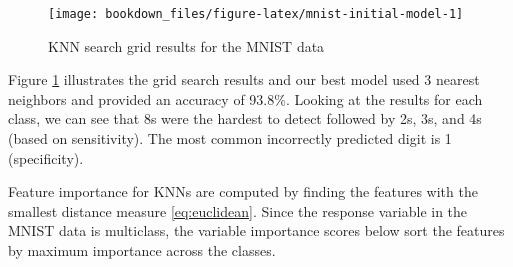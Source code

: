 \documentclass[]{krantz}
\makeatletter
\newenvironment{Shaded}{\begin{snugshade}}{\end{snugshade}}
\newcommand{\CommentTok}[1]{\textcolor[rgb]{0.37,0.37,0.37}{\textit{#1}}}
\newcommand{\DecValTok}[1]{\textcolor[rgb]{0.06,0.06,0.06}{#1}}
\newcommand{\KeywordTok}[1]{\textcolor[rgb]{0.27,0.27,0.27}{\textbf{#1}}}
\newcommand{\NormalTok}[1]{#1}
\newcommand{\OperatorTok}[1]{\textcolor[rgb]{0.43,0.43,0.43}{\textbf{#1}}}
\newcommand{\StringTok}[1]{\textcolor[rgb]{0.5,0.5,0.5}{#1}}
\newenvironment{kframe}{%
\medskip{}
\setlength{\fboxsep}{.8em}
 \def\at@end@of@kframe{}%
 \ifinner\ifhmode%
  \def\at@end@of@kframe{\end{minipage}}%
  \begin{minipage}{\columnwidth}%
 \fi\fi%
 \def\FrameCommand##1{\hskip\@totalleftmargin \hskip-\fboxsep
 \colorbox{shadecolor}{##1}\hskip-\fboxsep
     \hskip-\linewidth \hskip-\@totalleftmargin \hskip\columnwidth}%
 \MakeFramed {\advance\hsize-\width
   \@totalleftmargin\z@ \linewidth\hsize
   \@setminipage}}%
 {\par\unskip\endMakeFramed%
 \at@end@of@kframe}
\renewenvironment{Shaded}{\begin{kframe}}{\end{kframe}}
\makeatother
\begin{document}
\begin{figure}

{\centering \texttt{[image: bookdown\_files/figure-latex/mnist-initial-model-1]} 

}

\caption{KNN search grid results for the MNIST data}\label{fig:mnist-initial-model}
\end{figure}

Figure \ref{fig:mnist-initial-model} illustrates the grid search results and our best model used 3 nearest neighbors and provided an accuracy of 93.8\%. Looking at the results for each class, we can see that 8s were the hardest to detect followed by 2s, 3s, and 4s (based on sensitivity). The most common incorrectly predicted digit is 1 (specificity).

\begin{Shaded}
\end{Shaded}

Feature importance for KNNs are computed by finding the features with the smallest distance measure \eqref{eq:euclidean}. Since the response variable in the MNIST data is multiclass, the variable importance scores below sort the features by maximum importance across the classes.
\end{document}

